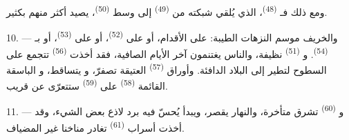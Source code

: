 ومع ذلك فـ \textsuperscript{(48)}، الذي يُلقي شبكته من
 \textsuperscript{(49)} إلى وسط  \textsuperscript{(50)}،
يصيد أكثر منهم بكثير.

10. --- والخريف موسم النزهات الطيبة: على الأقدام، أو على  \textsuperscript{(52)}، أو على  \textsuperscript{(53)}، أو
بـ \textsuperscript{(54)}. و \textsuperscript{(51)}
نظيفة، والناس يغتنمون آخر الأيام الصافية، فقد أخذت 
\textsuperscript{(56)} تتجمع على السطوح لتطير إلى البلاد الدافئة. وأوراق
 \textsuperscript{(57)} العتيقة تصفرّ، و يتساقط،
و الباسقة القائمة  \textsuperscript{(58)} على
 \textsuperscript{(59)} ستتعرّى عن قريب.

11. --- و \textsuperscript{(60)} تشرق متأخرة، والنهار يقصر، ويبدأ
 يُحسّ فيه برد لاذع بعض الشيء، وقد أخذت أسراب
 \textsuperscript{(61)} تغادر مناخنا غير المضياف.
\VUsaut{6.0mm}
\VUfilet{22mm}
